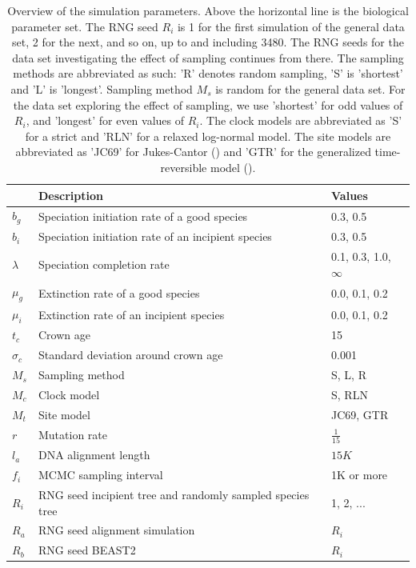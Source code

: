 \documentclass{article}
\begin{document}
\begin{table}
  \centering 
  \begin{tabular}{p{} p{} p{}}
    \hline
                          & Description & Values \\
    \hline
    \hline
    $b_g$                 & Speciation initiation rate of a good species & 0.3, 0.5 \\
    $b_i$                 & Speciation initiation rate of an incipient species & 0.3, 0.5 \\
    $\lambda$             & Speciation completion rate & 0.1, 0.3, 1.0, $\infty$ \\
    $\mu_g$               & Extinction rate of a good species & 0.0, 0.1, 0.2 \\
    $\mu_i$               & Extinction rate of an incipient species & 0.0, 0.1, 0.2 \\
    \hline
    $t_c$                 & Crown age & 15 \\
    $\sigma_c$            & Standard deviation around crown age & 0.001 \\
    $M_s$                 & Sampling method & S, L, R \\
    $M_c$                 & Clock model & S, RLN \\
    $M_t$                 & Site model & JC69, GTR \\
    $r$                   & Mutation rate & $\frac{1}{15}$ \\
    $l_a$                 & DNA alignment length & $15K$ \\
    $f_i$                 & MCMC sampling interval & 1K or more \\
    $R_i$                 & RNG seed incipient tree and randomly sampled species tree & 1, 2, ... \\
    $R_a$                 & RNG seed alignment simulation & $R_i$ \\
    $R_b$                 & RNG seed BEAST2 & $R_i$ \\
    \hline
  \end{tabular}
  \caption{
    Overview of the simulation parameters. Above the horizontal line is 
    the biological parameter set. 
    The RNG seed $R_i$ is 1 for the first simulation of the general data set, 2 for the next,
    and so on, up to and including 3480. The RNG seeds for the data set investigating the effect 
    of sampling continues from there.
    The sampling methods are abbreviated as such: 'R' denotes random
    sampling, 'S' is 'shortest' and 'L' is 'longest'. Sampling method $M_s$ is random for the general
    data set. For the data set exploring the effect of sampling, we use 'shortest'
    for odd values of $R_i$, and 'longest' for even values of $R_i$.
    The clock models are abbreviated as 'S' for a strict and 'RLN' for a relaxed log-normal model.
    The site models are abbreviated as 'JC69' for Jukes-Cantor (\cite{jc69}) and 'GTR' for the generalized 
    time-reversible model (\cite{gtr}).
  }
  \label{table:parameters}
\end{table}
\end{document}
